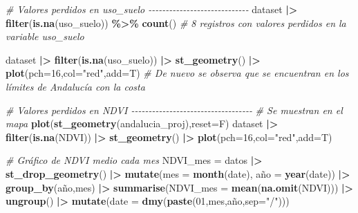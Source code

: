 \documentclass[12pt,a4paper,]{book}
\newenvironment{Shaded}{\begin{snugshade}}{\end{snugshade}}
\newcommand{\AttributeTok}[1]{\textcolor[rgb]{0.13,0.29,0.53}{#1}}
\newcommand{\CommentTok}[1]{\textcolor[rgb]{0.56,0.35,0.01}{\textit{#1}}}
\newcommand{\DecValTok}[1]{\textcolor[rgb]{0.00,0.00,0.81}{#1}}
\newcommand{\FunctionTok}[1]{\textcolor[rgb]{0.13,0.29,0.53}{\textbf{#1}}}
\newcommand{\NormalTok}[1]{#1}
\newcommand{\OtherTok}[1]{\textcolor[rgb]{0.56,0.35,0.01}{#1}}
\newcommand{\SpecialCharTok}[1]{\textcolor[rgb]{0.81,0.36,0.00}{\textbf{#1}}}
\newcommand{\StringTok}[1]{\textcolor[rgb]{0.31,0.60,0.02}{#1}}
\numberwithin{dummy}{section}
\theoremstyle{ocrenumbox}
\theoremstyle{blacknumex}
\theoremstyle{blacknumbox}
\theoremstyle{ocrenum}
\theoremstyle{ocrenum}
\begin{document}
\begin{Shaded}
\begin{Highlighting}[]
\CommentTok{\# Valores perdidos en uso\_suelo {-}{-}{-}{-}{-}{-}{-}{-}{-}{-}{-}{-}{-}{-}{-}{-}{-}{-}{-}{-}{-}{-}{-}{-}{-}{-}{-}{-}{-}}
\NormalTok{dataset }\SpecialCharTok{|\textgreater{}} \FunctionTok{filter}\NormalTok{(}\FunctionTok{is.na}\NormalTok{(uso\_suelo)) }\SpecialCharTok{\%\textgreater{}\%} \FunctionTok{count}\NormalTok{() }\CommentTok{\# 8 registros con valores perdidos en la variable uso\_suelo}

\NormalTok{dataset }\SpecialCharTok{|\textgreater{}} \FunctionTok{filter}\NormalTok{(}\FunctionTok{is.na}\NormalTok{(uso\_suelo)) }\SpecialCharTok{|\textgreater{}} \FunctionTok{st\_geometry}\NormalTok{() }\SpecialCharTok{|\textgreater{}} \FunctionTok{plot}\NormalTok{(}\AttributeTok{pch=}\DecValTok{16}\NormalTok{,}\AttributeTok{col=}\StringTok{"red"}\NormalTok{,}\AttributeTok{add=}\NormalTok{T)}
\CommentTok{\# De nuevo se observa que se encuentran en los límites de Andalucía con la costa}

\CommentTok{\# Valores perdidos en NDVI {-}{-}{-}{-}{-}{-}{-}{-}{-}{-}{-}{-}{-}{-}{-}{-}{-}{-}{-}{-}{-}{-}{-}{-}{-}{-}{-}{-}{-}{-}{-}{-}{-}{-}{-}}
\CommentTok{\# Se muestran en el mapa}
\FunctionTok{plot}\NormalTok{(}\FunctionTok{st\_geometry}\NormalTok{(andalucia\_proj),}\AttributeTok{reset=}\NormalTok{F)}
\NormalTok{dataset }\SpecialCharTok{|\textgreater{}} \FunctionTok{filter}\NormalTok{(}\FunctionTok{is.na}\NormalTok{(NDVI)) }\SpecialCharTok{|\textgreater{}} \FunctionTok{st\_geometry}\NormalTok{() }\SpecialCharTok{|\textgreater{}} \FunctionTok{plot}\NormalTok{(}\AttributeTok{pch=}\DecValTok{16}\NormalTok{,}\AttributeTok{col=}\StringTok{"red"}\NormalTok{,}\AttributeTok{add=}\NormalTok{T) }


\CommentTok{\# Gráfico de NDVI medio cada mes}
\NormalTok{NDVI\_mes }\OtherTok{=}\NormalTok{ datos }\SpecialCharTok{|\textgreater{}} 
  \FunctionTok{st\_drop\_geometry}\NormalTok{() }\SpecialCharTok{|\textgreater{}} 
  \FunctionTok{mutate}\NormalTok{(}\AttributeTok{mes =} \FunctionTok{month}\NormalTok{(date),}
\NormalTok{         año }\OtherTok{=} \FunctionTok{year}\NormalTok{(date)) }\SpecialCharTok{|\textgreater{}} 
  \FunctionTok{group\_by}\NormalTok{(año,mes) }\SpecialCharTok{|\textgreater{}} 
  \FunctionTok{summarise}\NormalTok{(}\AttributeTok{NDVI\_mes =} \FunctionTok{mean}\NormalTok{(}\FunctionTok{na.omit}\NormalTok{(NDVI))) }\SpecialCharTok{|\textgreater{}} 
  \FunctionTok{ungroup}\NormalTok{() }\SpecialCharTok{|\textgreater{}} 
  \FunctionTok{mutate}\NormalTok{(}\AttributeTok{date =} \FunctionTok{dmy}\NormalTok{(}\FunctionTok{paste}\NormalTok{(}\DecValTok{01}\NormalTok{,mes,año,}\AttributeTok{sep=}\StringTok{"/"}\NormalTok{)))}
  

\end{Highlighting}
\end{Shaded}
\end{document}
